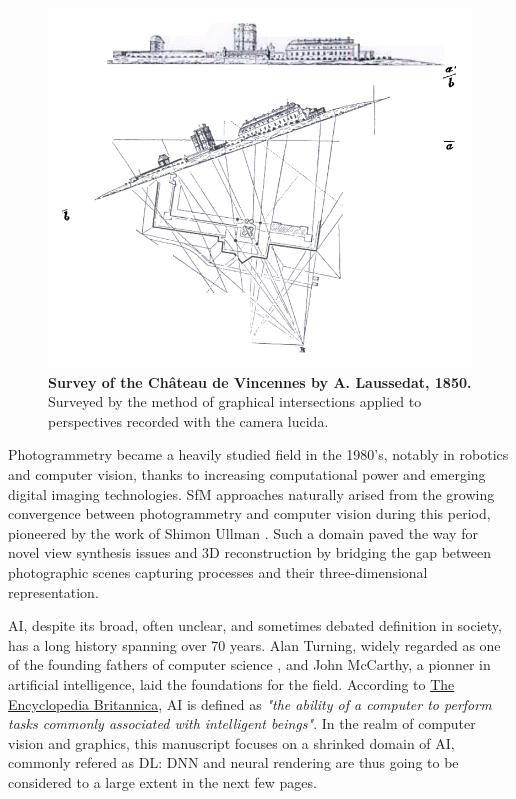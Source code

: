 \begin{figure}[htp!]
      \begin{center}
      \includegraphics[width=.5\textwidth]{images/introduction/laussedat_phtograpmetrie.png}
      \end{center}
      \caption{\textbf{Survey of the Château de Vincennes by A. Laussedat, 1850.} Surveyed by the method of graphical intersections applied to perspectives recorded with the camera lucida. }
      \label{fig:intro_laussedat}
\end{figure}

Photogrammetry became a heavily studied field in the 1980's, notably in robotics and computer vision, thanks to increasing computational power and emerging digital imaging technologies. \ac{SfM} approaches naturally arised from the growing convergence between photogrammetry and computer vision during this period, pioneered by the work of Shimon Ullman \citep{ullman1979interpretation}. Such a domain paved the way for novel view synthesis issues and 3D reconstruction by bridging the gap between photographic scenes capturing processes and their three-dimensional representation. 

\ac{AI}, despite its broad, often unclear, and sometimes debated definition in society, has a long history spanning over 70 years. Alan Turning, widely regarded as one of the founding fathers of computer science \citep{turing1950computing}, and John McCarthy, a pionner in artificial intelligence, laid the foundations for the field. According to \href{https://www.britannica.com/technology/artificial-intelligence}{The Encyclopedia Britannica}, \ac{AI} is defined as \textit{"the ability of a computer to perform tasks commonly associated with intelligent beings"}. In the realm of computer vision and graphics, this manuscript focuses on a shrinked domain of \ac{AI}, commonly refered as \ac{DL}: \ac{DNN} and neural rendering are thus going to be considered to a large extent in the next few pages.

